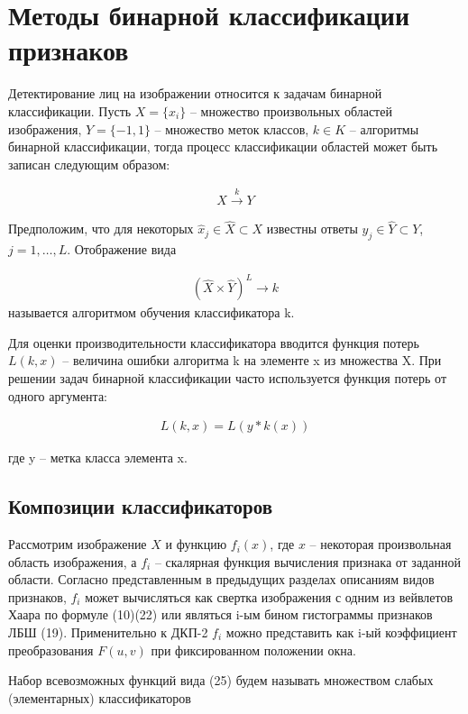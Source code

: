 \newpage
\section{Методы бинарной классификации признаков}

Детектирование лиц на изображении относится к задачам бинарной классификации. Пусть $X = \{x_i\}$ -- множество произвольных областей изображения, $Y = \{−1, 1\}$ -- множество меток классов, $k \in K$ -- алгоритмы бинарной классификации, тогда процесс классификации областей может быть записан следующим образом:

\begin{gather}
X\xrightarrow{k}Y
\end{gather}

Предположим, что для некоторых $\hat{x}_j \in \hat{X} \subset X$ известны ответы $\hat{y}_j \in \hat{Y} \subset Y$, $j = 1, \dots, L$. Отображение вида

\begin{gather}
(\hat{X} \times \hat{Y})^L \rightarrow k
\end{gather}
называется алгоритмом обучения классификатора k.

Для оценки производительности классификатора вводится функция потерь $L(k, x)$ -- величина ошибки алгоритма k на элементе x из множества X. При решении задач бинарной классификации часто используется функция потерь от одного аргумента:

\begin{gather}
L(k, x) = L(y \ast k(x))
\end{gather}

где y -- метка класса элемента x.

\subsection{Композиции классификаторов}

Рассмотрим изображение $X$ и функцию $f_i(x)$, где $x$ -- некоторая произвольная область изображения, а $f_i$ -- скалярная функция вычисления признака от заданной области. Согласно представленным в предыдущих разделах описаниям видов признаков, $f_i$ может вычисляться как свертка изображения с одним из вейвлетов
Хаара по формуле (10)(22) или являться i-ым бином гистограммы признаков ЛБШ (19). Применительно к ДКП-2 $f_i$ можно представить как i-ый коэффициент преобразования $F(u, v)$ при фиксированном положении окна.

Набор всевозможных функций вида (25) будем называть множеством слабых (элементарных) классификаторов

